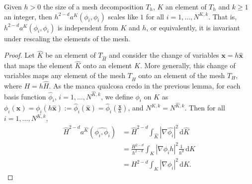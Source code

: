 \begin{lemma} \label{lemma2}
Given $h>0$ the size of a mesh decomposition $T_h$, $K$ an element of $T_h$ and $k\geq 1$ an integer, then $h^{2-d}a^K(\phi_i,\phi_i)$ scales like $1$ for all $i=1,\ldots,N^{K,k}$. That is, $h^{2-d}a^K(\phi_i,\phi_i)$ is independent from $K$ and $h$, or equivalently, it is invariant under rescaling the elements of the mesh. 
\end{lemma}
\begin{proof}
Let $\hat{K}$ be an element of $T_{\hat{H}}$ and consider the change of variables $\mathbf{x}=h\hat{\mathbf{x}}$ that maps the element $\hat{K}$ onto an element $K$. More generally, this change of variables maps any element of the mesh $T_{\hat{H}}$ onto an element of the mesh $T_H$, where $H=h\hat{H}$. As the {\color{red} manca qualcosa credo} in the previous lemma, for each basis function $\hat{\phi}_i$, $i=1,\ldots,N^{\hat{K},k}$, we define $\phi_i$ on $K$ as $\phi_i(\mathbf{x}) = \phi_i(h\mathbf{\hat{x}}) := \hat{\phi}_i(\hat{\mathbf{x}}) = \hat{\phi}_i\left(\frac{\mathbf{x}}{h}\right)$, and $N^{K,k}=N^{\hat{K},k}$. Then for all $i=1,\ldots,N^{K,k}$, 
\begin{align*}
\hat{H}^{2-d}a^{\hat{K}}(\hat{\phi_i,\phi_i}) &= \hat{H}^{2-d}\int_{\hat{K}} |\nabla \hat{\phi_i}|^2 \, \mathrm{d}\hat{K} \\
&= \frac{H^{2-d}}{h^{2-d}} \int_K |\nabla \phi_i h|^2 \frac{1}{h^d} \, \mathrm{d}K\\
&= H^{2-d} \int_K |\nabla \phi_i|^2 \, \mathrm{d}K.
\end{align*}
\end{proof}

